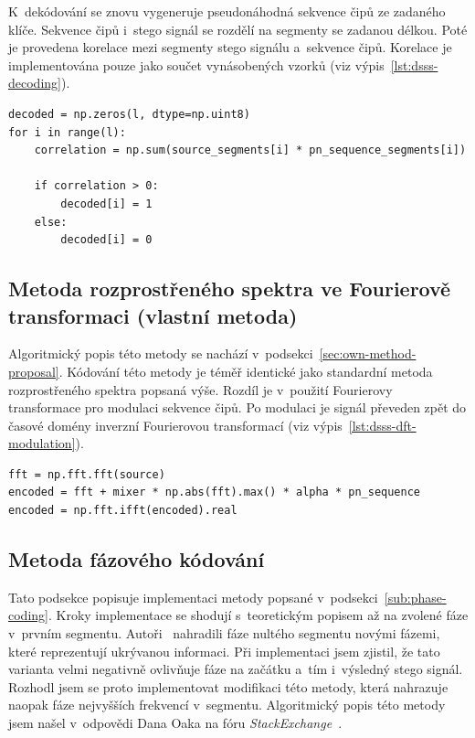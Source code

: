 K~dekódování se znovu vygeneruje pseudonáhodná sekvence čipů ze zadaného klíče.
Sekvence čipů i~stego signál se rozdělí na segmenty se zadanou délkou. Poté je
provedena korelace mezi segmenty stego signálu a~sekvence čipů. Korelace je
implementována pouze jako součet vynásobených vzorků (viz
výpis~\ref{lst:dsss-decoding}).

\begin{lstlisting}[language=PythonPlus, label={lst:dsss-decoding},
caption={Korelace segmentů a~rozhodovací pravidlo.}]
decoded = np.zeros(l, dtype=np.uint8)
for i in range(l):
    correlation = np.sum(source_segments[i] * pn_sequence_segments[i])

    if correlation > 0:
        decoded[i] = 1
    else:
        decoded[i] = 0
\end{lstlisting}

\subsection*{Metoda rozprostřeného spektra ve Fourierově transformaci (vlastní
metoda)}
\label{sub:dsssdft-implementation}

Algoritmický popis této metody se nachází
v~podsekci~\ref{sec:own-method-proposal}. Kódování této metody je téměř
identické jako standardní metoda rozprostřeného spektra popsaná výše. Rozdíl je
v~použití Fourierovy transformace pro modulaci sekvence čipů. Po modulaci je
signál převeden zpět do časové domény inverzní Fourierovou transformací (viz
výpis~\ref{lst:dsss-dft-modulation}).

\begin{lstlisting}[language=PythonPlus, label={lst:dsss-dft-modulation},
caption={Modulace Fourierovy transformace krycího signálu, rozprostřených bitů
a~pseudonáhodné sekvence čipů.}]
fft = np.fft.fft(source)
encoded = fft + mixer * np.abs(fft).max() * alpha * pn_sequence
encoded = np.fft.ifft(encoded).real
\end{lstlisting}

\subsection*{Metoda fázového kódování}
\label{sub:phase-coding-implementation}

Tato podsekce popisuje implementaci metody popsané
v~podsekci~\ref{sub:phase-coding}. Kroky implementace se shodují s~teoretickým
popisem až na zvolené fáze v~prvním segmentu. Autoři~\cite{Bender1996}
nahradili fáze nultého segmentu novými fázemi, které reprezentují ukrývanou
informaci. Při implementaci jsem zjistil, že tato varianta velmi negativně
ovlivňuje fáze na začátku a~tím i~výsledný stego signál. Rozhodl jsem se proto
implementovat modifikaci této metody, která nahrazuje naopak fáze nejvyšších
frekvencí v~segmentu. Algoritmický popis této metody jsem našel v~odpovědi Dana
Oaka na fóru \textit{StackExchange}~\cite{PhaseStackExchange}.

